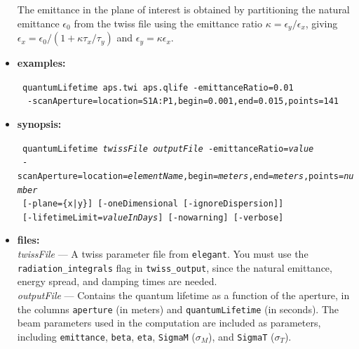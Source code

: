 \documentclass[11pt]{article}
\begin{document}
\begin{itemize}
The emittance in the plane of interest is obtained by partitioning the natural emittance $\epsilon_0$ from the
twiss file using the emittance ratio $\kappa = \epsilon_y/\epsilon_x$, giving
$\epsilon_x = \epsilon_0/\left(1 + \kappa \tau_x/\tau_y\right)$ and $\epsilon_y = \kappa \epsilon_x$.

\item {\bf examples:}
\begin{flushleft}{\tt
quantumLifetime aps.twi aps.qlife -emittanceRatio=0.01 \\
~~-scanAperture=location=S1A:P1,begin=0.001,end=0.015,points=141
}\end{flushleft}

\item {\bf synopsis:}
\begin{flushleft}{\tt
quantumLifetime {\em twissFile} {\em outputFile} -emittanceRatio={\em value} \\
~-scanAperture=location={\em elementName},begin={\em meters},end={\em meters},points={\em number} \\
~[-plane=\{x|y\}] [-oneDimensional [-ignoreDispersion]] \\
~[-lifetimeLimit={\em valueInDays}] [-nowarning] [-verbose]
}\end{flushleft}

\item {\bf files:} \\
{\em twissFile} --- A twiss parameter file from {\tt elegant}.  You must use the \verb|radiation_integrals|
flag in \verb|twiss_output|, since the natural emittance, energy spread, and damping times are needed. \\
{\em outputFile} --- Contains the quantum lifetime as a function of the aperture, in the columns
\verb|aperture| (in meters) and \verb|quantumLifetime| (in seconds).  The beam parameters used in the
computation are included as parameters, including \verb|emittance|, \verb|beta|, \verb|eta|,
\verb|SigmaM| ($\sigma_M$), and \verb|SigmaT| ($\sigma_T$).


\end{itemize}
\end{document}
